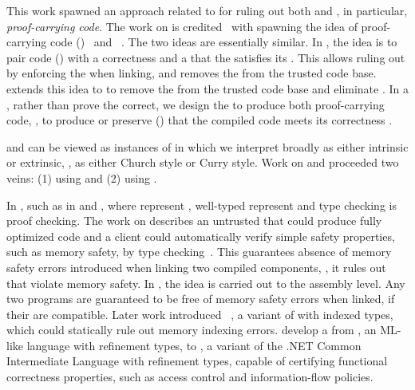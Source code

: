 This work spawned an approach related to  for ruling out
both  and , in particular,
\emph{proof-carrying code}.
The work on  is credited~\cite{tarditi2004} with spawning the idea of
proof-carrying code ()~\cite{necula1997} and ~\cite{necula1998}.
The two ideas are essentially similar.
In , the idea is to pair  code ()
with a correctness  and a  that the
 satisfies its .
This allows ruling out  by enforcing the
 when linking, and removes the  from
the trusted code base.
 extends this idea to  to remove
the  from the trusted code base and eliminate
.
In a , rather than prove the  correct,
we design the  to produce both proof-carrying code, \ie, to
produce or preserve  () that the compiled
code meets its correctness .

 and  can be viewed as instances of
 in which we interpret  broadly as either
intrinsic or extrinsic, \ie, as either Church style or Curry style.
Work on  and  proceeded two veins: (1)
using  and (2) using
.

In , such as in 
and , where  represent , well-typed
 represent  and type checking is proof
checking.
The work on  describes an untrusted  that could produce
fully optimized  code and a client could automatically verify simple
safety properties, such as memory safety, by type checking~\cite{tarditi1996}.
This guarantees absence of memory safety errors introduced when linking two
compiled components, \ie, it rules out  that violate memory
safety.
In , the idea is carried out to the assembly level.
Any two  programs are guaranteed to be free of memory safety errors
when linked, if their  are compatible.
Later work introduced ~\cite{xi2001}, a variant of  with
indexed types, which could statically rule out memory indexing errors.
\citet{chen2010} develop a  from , an
ML-like language with refinement types, to , a variant of the .NET
Common Intermediate Language with refinement types, capable of certifying
functional correctness properties, such as access control and information-flow
policies.

